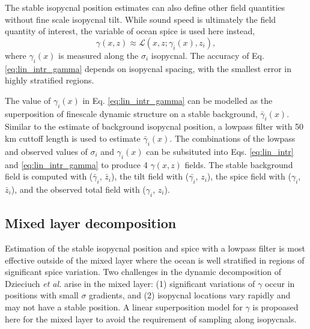 \documentclass[preprint,NumberedRefs]{JASA}
\begin{document}
The stable isopycnal position estimates can also define other field quantities without fine scale isopycnal tilt. While sound speed is ultimately the field quantity of interest, the variable of ocean spice is used here instead,
\begin{equation}
    \gamma(x, z)\approx\mathcal{L}(x, z; \gamma_i(x), z_i),
    \label{eq:lin_intr_gamma}
\end{equation}
where $\gamma_i(x)$ is measured along the $\sigma_i$ isopycnal. The accuracy of Eq. \eqref{eq:lin_intr_gamma} depends on isopycnal spacing, with the smallest error in highly stratified regions.

The value of $\gamma_i(x)$ in Eq. \eqref{eq:lin_intr_gamma} can be modelled as the superposition of finescale dynamic structure on a stable background, $\bar{\gamma}_i(x)$. Similar to the estimate of background isopycnal position, a lowpass filter with 50 km cuttoff length is used to estimate $\bar{\gamma}_i(x)$. The combinations of the lowpass and observed values of $\sigma_i$ and $\gamma_i(x)$ can be subsituted into Eqs. \eqref{eq:lin_intr} and \eqref{eq:lin_intr_gamma} to produce 4 $\gamma(x,z)$ fields. The stable background field is computed with ($\bar{\gamma}_i$, $\bar{z}_i$), the tilt field with ($\bar{\gamma_i}$, $z_i$), the spice field with ($\gamma_i$, $\bar{z}_i$), and the observed total field with ($\gamma_i$, $z_i$).


\subsection{Mixed layer decomposition}
Estimation of the stable isopycnal position and spice with a lowpass filter is most effective outside of the mixed layer where the ocean is well stratified in regions of significant spice variation. Two challenges in the dynamic decomposition of Dzieciuch \emph{et al.}\citep{dzieciuch2004} arise in the mixed layer: (1) significant variations of $\gamma$ occur in positions with small $\sigma$ gradients, and (2) isopycnal locations vary rapidly and may not have a stable position. A linear superposition model for $\gamma$ is propoased here for the mixed layer to avoid the requirement of sampling along isopycnals.
\end{document}
